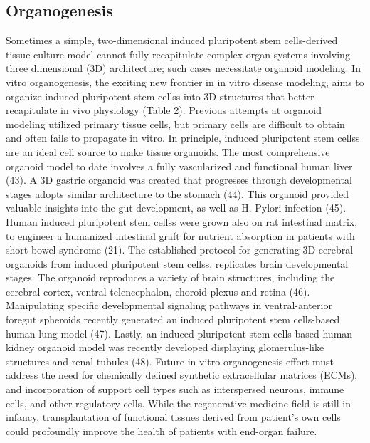 \documentclass[sigconf]{acmart}
\begin{document}
\subsection{Organogenesis}
Sometimes a simple, two-dimensional  induced pluripotent stem cells-derived tissue culture model cannot fully
recapitulate complex organ systems involving three dimensional (3D) architecture; such cases
necessitate organoid modeling. In vitro organogenesis, the exciting new frontier in in vitro
disease modeling, aims to organize  induced pluripotent stem cellss into 3D structures that better recapitulate in vivo
physiology (Table 2). Previous attempts at organoid modeling utilized primary tissue cells, but
primary cells are difficult to obtain and often fails to propagate in vitro. In principle,  induced pluripotent stem cellss are
an ideal cell source to make tissue organoids. 
The most comprehensive organoid model to date involves a fully vascularized and functional human liver (43). A 3D gastric organoid was created that progresses through developmental stages adopts similar architecture to the stomach (44). This organoid provided valuable insights into the gut development, as well as H. Pylori infection (45). Human  induced pluripotent stem cellss were grown also on rat intestinal matrix, to engineer a humanized intestinal graft for nutrient absorption in patients with short bowel syndrome (21). The established protocol for generating 3D cerebral organoids from  induced pluripotent stem cellss, replicates brain developmental stages. The organoid reproduces a variety of brain structures, including the cerebral cortex, ventral telencephalon, choroid plexus and retina (46). Manipulating specific developmental signaling pathways in ventral-anterior foregut spheroids recently generated an  induced pluripotent stem cells-based human lung model (47). Lastly, an  induced pluripotent stem cells-based human kidney organoid model was recently developed displaying glomerulus-like structures and renal tubules (48). 
Future in vitro organogenesis effort must address the need for chemically defined synthetic extracellular matrices (ECMs), and incorporation of support cell types such as interspersed neurons, immune cells, and other regulatory cells. While the regenerative medicine field is still in infancy, transplantation of functional tissues derived from patient's own cells could profoundly improve the health of patients with end-organ failure.
\end{document}
